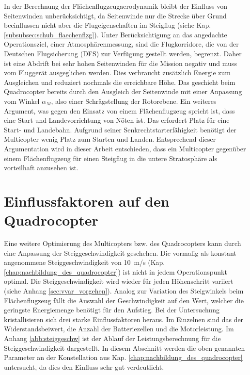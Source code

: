 In der Berechnung der Flächenflugzeugaerodynamik bleibt der Einfluss von Seitenwinden unberücksichtigt, da Seitenwinde nur die Strecke über Grund beeinflussen nicht aber die Flugeigenschaften im Steigflug (siehe Kap. \ref{subsubsec:schub_flaechenflzg}). Unter Berücksichtigung an das angedachte Operationsziel, einer Atmosphärenmessung, sind die Flugkorridore, die von der Deutschen Flugsicherung (DFS) zur Verfügung gestellt werden, begrenzt. Daher ist eine Abdrift bei sehr hohen Seitenwinden für die Mission negativ und muss vom Fluggerät ausgeglichen werden. Dies verbraucht zusätzlich Energie zum Ausgleichen und reduziert nochmals die erreichbare Höhe. Das geschieht beim Quadrocopter bereits durch den Ausgleich der Seitenwinde mit einer Anpassung vom Winkel \ensuremath{\alpha_{M}}, also einer Schrägstellung der Rotorebene. Ein weiteres Argument, was gegen den Einsatz von einem Flächenflugzeug spricht ist, dass eine Start und Landevorrichtung von Nöten ist. Das erfordert Platz für eine Start- und Landebahn. Aufgrund seiner Senkrechtstarterfähigkeit benötigt der Multicopter wenig Platz zum Starten und Landen. 
Entsprechend dieser Argumentation wird in dieser Arbeit entschieden, dass ein Multicopter gegenüber einem Flächenflugzeug für einen Steigflug in die untere Stratosphäre als vorteilhaft anzusehen ist.


\newpage
\section{Einflussfaktoren auf den Quadrocopter}
\label{sec:steiggeschwindigkeit}
Eine weitere Optimierung des Multicopters bzw. des Quadrocopters kann durch eine Anpassung der Steiggeschwindigkeit geschehen. Die vormalig als konstant angenommene Steiggeschwindigkeit von \SI{10}{m/s} (Kap. \ref{chap:nachbildung_des_quadrocopter}) ist nicht in jedem Operationspunkt optimal. Die Steiggeschwindigkeit wird wieder für jeden Höhenschritt variiert (siehe Anhang \ref{sec:vvar_vorgehen}). Analog zur Variation des Steigwinkels beim Flächenflugzeug fällt die Auswahl der Geschwindigkeit auf den Wert, welcher die geringste Energiemenge benötigt für den Aufstieg. Bei der Untersuchung kristallisieren sich drei starke Einflussfaktoren heraus. Im Einzelnen sind das der Widerstandsbeiwert, die Anzahl der Batteriezellen und die Motorleistung. Im Anhang \ref{abb:steiggeschw} ist der Ablauf der Leistungsberechnung für die Steiggeschwindigkeit dargestellt. In diesem Abschnitt werden die oben genannten Parameter an der Konstellation aus Kap. \ref{chap:nachbildung_des_quadrocopter} untersucht, da dies den Einfluss sehr gut verdeutlicht.


